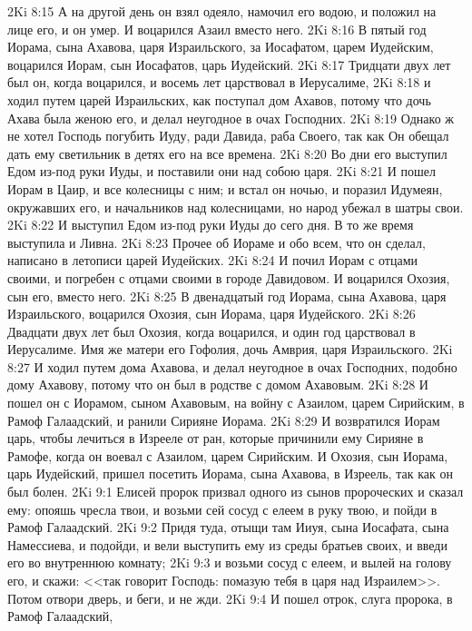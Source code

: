 \vs 2Ki 8:15 А на другой день он взял одеяло, намочил его водою, и положил на лице его, и он умер. И воцарился Азаил вместо него.
\rsbpar\vs 2Ki 8:16 В пятый год Иорама, сына Ахавова, царя Израильского, за Иосафатом, царем Иудейским, воцарился Иорам, сын Иосафатов, царь Иудейский.
\vs 2Ki 8:17 Тридцати двух лет был он, когда воцарился, и восемь лет царствовал в Иерусалиме,
\vs 2Ki 8:18 и ходил путем царей Израильских, как поступал дом Ахавов, потому что дочь Ахава была женою его, и делал неугодное в очах Господних.
\vs 2Ki 8:19 Однако ж не хотел Господь погубить Иуду, ради Давида, раба Своего, так как Он обещал дать ему светильник в детях его на все времена.
\vs 2Ki 8:20 Во дни его выступил Едом из-под руки Иуды, и поставили они над собою царя.
\vs 2Ki 8:21 И пошел Иорам в Цаир, и все колесницы с ним; и встал он ночью, и поразил Идумеян, окружавших его, и начальников над колесницами, но народ убежал в шатры свои.
\vs 2Ki 8:22 И выступил Едом из-под руки Иуды до сего дня. В то же время выступила и Ливна.
\rsbpar\vs 2Ki 8:23 Прочее об Иораме и обо всем, что он сделал, написано в летописи царей Иудейских.
\vs 2Ki 8:24 И почил Иорам с отцами своими, и погребен с отцами своими в городе Давидовом. И воцарился Охозия, сын его, вместо него.
\rsbpar\vs 2Ki 8:25 В двенадцатый год Иорама, сына Ахавова, царя Израильского, воцарился Охозия, сын Иорама, царя Иудейского.
\vs 2Ki 8:26 Двадцати двух лет был Охозия, когда воцарился, и один год царствовал в Иерусалиме. Имя же матери его Гофолия, дочь Амврия, царя Израильского.
\vs 2Ki 8:27 И ходил путем дома Ахавова, и делал неугодное в очах Господних, подобно дому Ахавову, потому что он был в родстве с домом Ахавовым.
\vs 2Ki 8:28 И пошел он с Иорамом, сыном Ахавовым, на войну с Азаилом, царем Сирийским, в Рамоф Галаадский, и ранили Сирияне Иорама.
\vs 2Ki 8:29 И возвратился Иорам царь, чтобы лечиться в Изрееле от ран, которые причинили ему Сирияне в Рамофе, когда он воевал с Азаилом, царем Сирийским. И Охозия, сын Иорама, царь Иудейский, пришел посетить Иорама, сына Ахавова, в Изреель, так как он был болен.
\vs 2Ki 9:1 Елисей пророк призвал одного из сынов пророческих и сказал ему: опояшь чресла твои, и возьми сей сосуд с елеем в руку твою, и пойди в Рамоф Галаадский.
\vs 2Ki 9:2 Придя туда, отыщи там Ииуя, сына Иосафата, сына Намессиева, и подойди, и вели выступить ему из среды братьев своих, и введи его во внутреннюю комнату;
\vs 2Ki 9:3 и возьми сосуд с елеем, и вылей на голову его, и скажи: <<так говорит Господь: помазую тебя в царя над Израилем>>. Потом отвори дверь, и беги, и не жди.
\vs 2Ki 9:4 И пошел отрок, слуга пророка, в Рамоф Галаадский,
